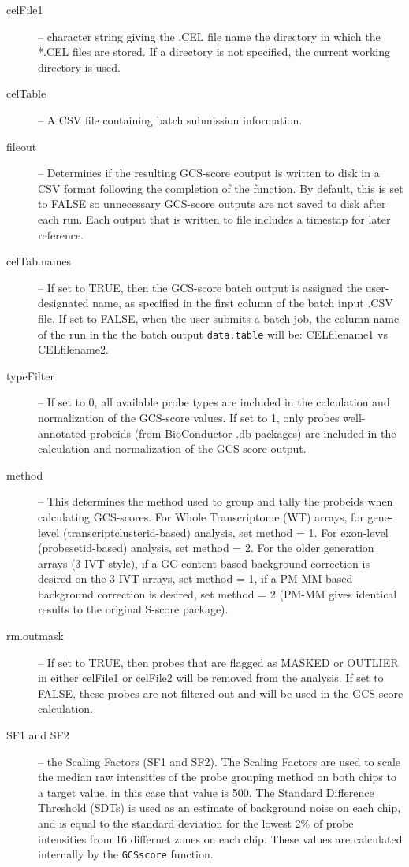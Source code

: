 \documentclass[12pt]{article}
\newcommand{\Rfunction}[1]{{\texttt{#1}}}
\newcommand{\Robject}[1]{{\texttt{#1}}}
\begin{document}
\begin{description}
\item[celFile1] -- character string giving the .CEL file name the directory in which the *.CEL files are stored. If a directory is not specified, the current working directory is used.
\item[celTable] -- A CSV file containing batch submission information. 
\item[fileout] -- Determines if the resulting GCS-score coutput is written to disk 
in a CSV format following the completion of the function. By default, this is set to FALSE so unnecessary GCS-score outputs are not saved to disk after each run.  Each output that is written to file includes a timestap for later reference.
\item[celTab.names] -- If set to TRUE, then the GCS-score batch output is assigned the user-designated name, as specified in the first column of the batch input .CSV file. If set to FALSE, when the user submits a batch job, the column name of the run in the the batch output \Robject{data.table} will be: CELfilename1 vs CELfilename2.
\item[typeFilter] -- If set to 0, all available probe types are included in the calculation and normalization of the GCS-score values. If set to 1, only probes  well-annotated probeids (from BioConductor .db packages) are included in the calculation and normalization of the GCS-score output.
\item[method] -- This determines the method used to group and tally the probeids when calculating GCS-scores.  For Whole Transcriptome (WT) arrays, for gene-level (transcriptclusterid-based) analysis, set method = 1. For exon-level (probesetid-based) analysis, set method = 2.  For the older generation arrays (3 IVT-style), if a GC-content based background correction is desired on the 3 IVT arrays, set method = 1, if a PM-MM based background correction is desired, set method = 2 (PM-MM gives identical results to the original S-score package).   
\item[rm.outmask] -- If set to TRUE, then probes that are flagged as MASKED or OUTLIER in either celFile1 or celFile2 will be removed from the analysis.  If set to FALSE, these probes are not filtered out and will be used in the GCS-score calculation.
\item[SF1 and SF2] -- the Scaling Factors (SF1 and SF2). The Scaling Factors are used to scale the median raw intensities of the probe grouping method on both chips to a target value, in this case that value is 500. The Standard Difference Threshold (SDTs) is used as an estimate of background noise on each chip, and is equal to the standard deviation for the lowest 2\% of probe intensities from 16 differnet zones on each chip. These values are calculated internally by the \Rfunction{GCSscore} function.

\end{description}
\end{document}
